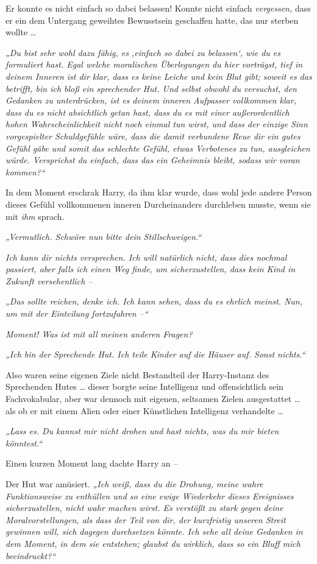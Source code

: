 Er konnte es nicht einfach so dabei belassen! Konnte nicht einfach \emph{vergessen,} dass er ein dem Untergang geweihtes Bewusstsein geschaffen hatte, das nur sterben wollte … 

\emph{„Du bist sehr wohl dazu fähig, es ‚einfach so dabei zu belassen‘, wie du es formuliert hast. Egal welche moralischen Überlegungen du hier vorträgst, tief in deinem Inneren ist dir klar, dass es keine Leiche und kein Blut gibt; soweit es das betrifft, bin ich bloß ein sprechender Hut. Und selbst obwohl du versuchst, den Gedanken zu unterdrücken, ist es deinem inneren Aufpasser vollkommen klar, dass du es nicht absichtlich getan hast, dass du es mit einer außerordentlich hohen Wahrscheinlichkeit nicht noch einmal tun wirst, und dass der einzige Sinn vorgespielter Schuldgefühle wäre, dass die damit verbundene Reue dir ein gutes Gefühl gäbe und somit das schlechte Gefühl, etwas Verbotenes zu tun, ausgleichen würde. Versprichst du einfach, dass das ein Geheimnis bleibt, sodass wir voran kommen?“} 

In dem Moment erschrak Harry, da ihm klar wurde, dass wohl jede andere Person dieses Gefühl vollkommenen inneren Durcheinanders durchleben musste, wenn sie mit \emph{ihm} sprach. 

\emph{„Vermutlich. Schwöre nun bitte dein Stillschweigen.“}

\emph{Ich kann dir nichts versprechen. Ich will natürlich nicht, dass dies nochmal passiert, aber falls ich einen Weg finde, um sicherzustellen, dass kein Kind in Zukunft versehentlich –}

\emph{„Das sollte reichen, denke ich. Ich kann sehen, dass du es ehrlich meinst. Nun, um mit der Einteilung fortzufahren –“}

\emph{Moment! Was ist mit all meinen anderen Fragen?}

\emph{„Ich bin der Sprechende Hut. Ich teile Kinder auf die Häuser auf. Sonst nichts.“}

Also waren seine eigenen Ziele nicht Bestandteil der Harry-Instanz des Sprechenden Hutes … dieser borgte seine Intelligenz und offensichtlich sein Fachvokabular, aber war dennoch mit eigenen, seltsamen Zielen ausgestattet … als ob er mit einem Alien oder einer Künstlichen Intelligenz verhandelte …

\emph{„Lass es. Du kannst mir nicht drohen und hast nichts, was du mir bieten könntest.“}

Einen kurzen Moment lang dachte Harry an –

Der Hut war amüsiert. \emph{„Ich weiß, dass du die Drohung, meine wahre Funktionsweise zu enthüllen und so eine ewige Wiederkehr dieses Ereignisses sicherzustellen, nicht wahr machen wirst. Es verstößt zu stark gegen deine Moralvorstellungen, als dass der Teil von dir, der kurzfristig unseren Streit gewinnen will, sich dagegen durchsetzen könnte. Ich sehe all deine Gedanken in dem Moment, in dem sie entstehen; glaubst du wirklich, dass so ein Bluff mich beeindruckt?“}

